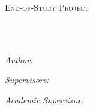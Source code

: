 \documentclass[
11pt, %
english, %
singlespacing, %
headsepline, %
]{MastersDoctoralThesis} %
\author{Gabriel \textsc{Suc}} %
\begin{document}
\frontmatter %

\pagestyle{plain} %


\begin{titlepage}
\begin{center}

\vspace*{.06\textheight}
{\scshape\LARGE \univname\par}\vspace{1.5cm} %
\textsc{\Large End-of-Study Project}\\[0.5cm] %

\HRule \\[0.4cm] %
{\huge \bfseries \ttitle\par}\vspace{0.4cm} %
\HRule \\[1.5cm] %
 
\begin{minipage}[t]{0.4\textwidth}
\begin{flushleft} \large
\emph{Author:}\\
\authorname %
\end{flushleft}
\end{minipage}
\begin{minipage}[t]{0.4\textwidth}
\begin{flushright} \large
\emph{Supervisors:} \\
	\supname %
	
	\vspace*{.02\textheight}
\emph{Academic Supervisor:} \\
	\mbox{\examname}	
\end{flushright}
\end{minipage}%
 
 
\vspace*{.03\textheight}



\end{center}
\end{titlepage}
\end{document}
